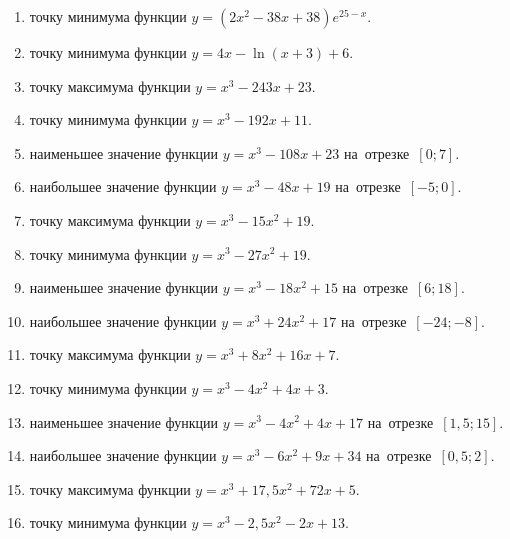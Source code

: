 \documentclass[a4paper,10pt]{article}
\begin{document}
\begin{enumerate}
\item {} точку минимума функции $y=\left(2x^2-38x+38\right){{e}^{25-x}}$.

\item {} точку минимума функции $y=4x-\ln \left(x+3\right)+6$.

\item {} точку максимума функции $y=x^3 -243x +23$.

\item {} точку минимума функции $y=x^3 -192x+11$.

\item {} наименьшее значение функции $y=x^3 -108x+23$ на~отрезке~$\left[0;7\right]$.

\item {} наибольшее значение функции $y=x^3 -48x+19$ на~отрезке~$\left[-5;0\right]$.

\item {} точку максимума функции $y=x^3 -15x^2+19$.

\item {} точку минимума функции $y=x^3 -27x^2+19$.

\item {} наименьшее значение функции $y=x^3 -18x^2+15$ на~отрезке~$\left[6;18\right]$.

\item {} наибольшее значение функции $y=x^3 +24x^2+17$ на~отрезке~$\left[-24;-8\right]$.

\item {} точку максимума функции $y=x^3 +8x^2+16x+7$.

\item {} точку минимума функции $y=x^3 -4x^2+4x+3$.

\item {} наименьшее значение функции $y=x^3 -4x^2+4x+17$ на~отрезке~$\left[1,5;15\right]$.

\item {} наибольшее значение функции $y=x^3 -6x^2+9x+34$ на~отрезке~$\left[0,5;2\right]$.

\item {} точку максимума функции $y=x^3 +17,5x^2+72x+5$.

\item {} точку минимума функции $y=x^3 -2,5x^2-2x+13$.


\end{enumerate}
\end{document}
